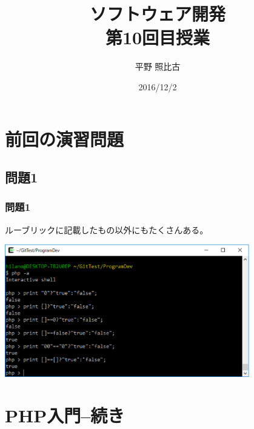 
\title{ソフトウェア開発\\第10回目授業}
\author{平野 照比古}
\institute{}
\date{2016/12/2}
\newtheorem{Prob}{解説}
\newcommand{\Elm}[1]{\texttt{<#1>}}

\newcommand{\DOMM}{\texttt}
\newcommand{\Event}{\texttt}
\newcommand{\DOMP}{\texttt}
\newcommand{\DOM}{\texttt{DOM}}
\newcommand{\keyitem}{\relax}
\newcommand{\HTML}{HTML文書}

\frame{\maketitle}
\section{前回の演習問題}
\subsection{問題1}
\begin{frame}[containsverbatim]
 \frametitle{問題1}
 ルーブリックに記載したもの以外にもたくさんある。
\begin{center}
 \includegraphics[width=0.8\textwidth]{09-01fig-result1.eps}
\end{center}
\end{frame}
\section{PHP入門--続き}
 
